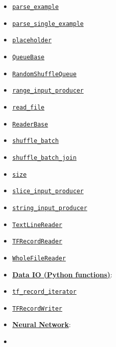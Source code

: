 \begin{itemize}
\item
  \href{../../api_docs/python/io_ops.md\#parse_example}{\texttt{parse\_example}}
\item
  \href{../../api_docs/python/io_ops.md\#parse_single_example}{\texttt{parse\_single\_example}}
\item
  \href{../../api_docs/python/io_ops.md\#placeholder}{\texttt{placeholder}}
\item
  \href{../../api_docs/python/io_ops.md\#QueueBase}{\texttt{QueueBase}}
\item
  \href{../../api_docs/python/io_ops.md\#RandomShuffleQueue}{\texttt{RandomShuffleQueue}}
\item
  \href{../../api_docs/python/io_ops.md\#range_input_producer}{\texttt{range\_input\_producer}}
\item
  \href{../../api_docs/python/io_ops.md\#read_file}{\texttt{read\_file}}
\item
  \href{../../api_docs/python/io_ops.md\#ReaderBase}{\texttt{ReaderBase}}
\item
  \href{../../api_docs/python/io_ops.md\#shuffle_batch}{\texttt{shuffle\_batch}}
\item
  \href{../../api_docs/python/io_ops.md\#shuffle_batch_join}{\texttt{shuffle\_batch\_join}}
\item
  \href{../../api_docs/python/io_ops.md\#size}{\texttt{size}}
\item
  \href{../../api_docs/python/io_ops.md\#slice_input_producer}{\texttt{slice\_input\_producer}}
\item
  \href{../../api_docs/python/io_ops.md\#string_input_producer}{\texttt{string\_input\_producer}}
\item
  \href{../../api_docs/python/io_ops.md\#TextLineReader}{\texttt{TextLineReader}}
\item
  \href{../../api_docs/python/io_ops.md\#TFRecordReader}{\texttt{TFRecordReader}}
\item
  \href{../../api_docs/python/io_ops.md\#WholeFileReader}{\texttt{WholeFileReader}}
\item
  \textbf{\href{../../api_docs/python/python_io.md}{Data IO (Python
  functions)}}:
\item
  \href{../../api_docs/python/python_io.md\#tf_record_iterator}{\texttt{tf\_record\_iterator}}
\item
  \href{../../api_docs/python/python_io.md\#TFRecordWriter}{\texttt{TFRecordWriter}}
\item
  \textbf{\href{../../api_docs/python/nn.md}{Neural Network}}:
\item

\end{itemize}
